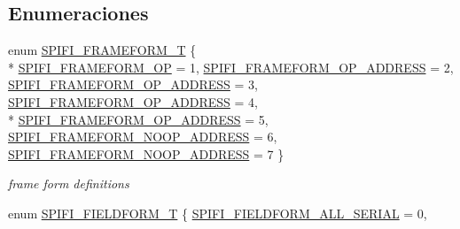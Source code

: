 \subsection*{Enumeraciones}
\begin{DoxyCompactItemize}
\item 
enum \hyperlink{group___l_p_c_s_p_i_f_i_l_i_b___h_w___p_r_i_m_ga83a0cb36aa268d35220e3d3e25453bd8}{S\+P\+I\+F\+I\+\_\+\+F\+R\+A\+M\+E\+F\+O\+R\+M\+\_\+T} \{ \\*
\hyperlink{group___l_p_c_s_p_i_f_i_l_i_b___h_w___p_r_i_m_gga83a0cb36aa268d35220e3d3e25453bd8a7ab8d7bdd5049867baaa844a849d5064}{S\+P\+I\+F\+I\+\_\+\+F\+R\+A\+M\+E\+F\+O\+R\+M\+\_\+\+OP} = 1, 
\hyperlink{group___l_p_c_s_p_i_f_i_l_i_b___h_w___p_r_i_m_gga83a0cb36aa268d35220e3d3e25453bd8a8b5ae3e8e4b6d054f6209e3ae9f60240}{S\+P\+I\+F\+I\+\_\+\+F\+R\+A\+M\+E\+F\+O\+R\+M\+\_\+\+O\+P\+\_\+A\+D\+D\+R\+E\+SS} = 2, 
\hyperlink{group___l_p_c_s_p_i_f_i_l_i_b___h_w___p_r_i_m_gga83a0cb36aa268d35220e3d3e25453bd8ac2ef53b5e3e5b22924a84a692cfb1d34}{S\+P\+I\+F\+I\+\_\+\+F\+R\+A\+M\+E\+F\+O\+R\+M\+\_\+\+O\+P\+\_\+A\+D\+D\+R\+E\+SS} = 3, 
\hyperlink{group___l_p_c_s_p_i_f_i_l_i_b___h_w___p_r_i_m_gga83a0cb36aa268d35220e3d3e25453bd8acbe7cef5c879c104868e87e1ba02e48b}{S\+P\+I\+F\+I\+\_\+\+F\+R\+A\+M\+E\+F\+O\+R\+M\+\_\+\+O\+P\+\_\+A\+D\+D\+R\+E\+SS} = 4, 
\\*
\hyperlink{group___l_p_c_s_p_i_f_i_l_i_b___h_w___p_r_i_m_gga83a0cb36aa268d35220e3d3e25453bd8a6e7d0e18073d1831d0689d1f1da914a8}{S\+P\+I\+F\+I\+\_\+\+F\+R\+A\+M\+E\+F\+O\+R\+M\+\_\+\+O\+P\+\_\+A\+D\+D\+R\+E\+SS} = 5, 
\hyperlink{group___l_p_c_s_p_i_f_i_l_i_b___h_w___p_r_i_m_gga83a0cb36aa268d35220e3d3e25453bd8abf603149dbd5f454517389b8a4a25572}{S\+P\+I\+F\+I\+\_\+\+F\+R\+A\+M\+E\+F\+O\+R\+M\+\_\+\+N\+O\+O\+P\+\_\+A\+D\+D\+R\+E\+SS} = 6, 
\hyperlink{group___l_p_c_s_p_i_f_i_l_i_b___h_w___p_r_i_m_gga83a0cb36aa268d35220e3d3e25453bd8acd367818a9c5d4c534e8e853f9ebde99}{S\+P\+I\+F\+I\+\_\+\+F\+R\+A\+M\+E\+F\+O\+R\+M\+\_\+\+N\+O\+O\+P\+\_\+A\+D\+D\+R\+E\+SS} = 7
 \}\begin{DoxyCompactList}\small\item\em frame form definitions \end{DoxyCompactList}
\item 
enum \hyperlink{group___l_p_c_s_p_i_f_i_l_i_b___h_w___p_r_i_m_gae4177c2639b4aa20ccdc833c2ef42123}{S\+P\+I\+F\+I\+\_\+\+F\+I\+E\+L\+D\+F\+O\+R\+M\+\_\+T} \{ \hyperlink{group___l_p_c_s_p_i_f_i_l_i_b___h_w___p_r_i_m_ggae4177c2639b4aa20ccdc833c2ef42123a0f1c08fd008999a26a107832f197056b}{S\+P\+I\+F\+I\+\_\+\+F\+I\+E\+L\+D\+F\+O\+R\+M\+\_\+\+A\+L\+L\+\_\+\+S\+E\+R\+I\+AL} = 0, 

\end{DoxyCompactItemize}
